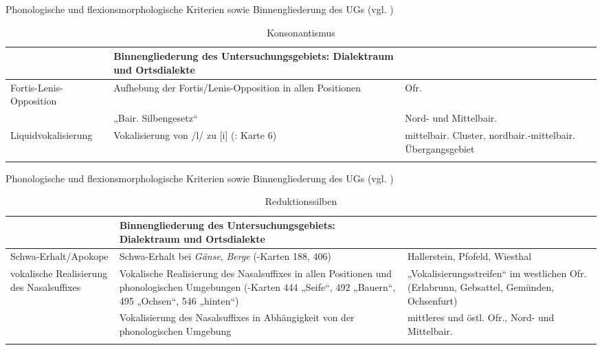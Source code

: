 \begin{table}
\ContinuedFloat
\caption{Phonologische und flexionsmorphologische Kriterien sowie Binnengliederung des UGs (vgl. \citealt[4--5]{Rowley1997})}

\begin{subtable}{\textwidth}
\caption{Konsonantismus}
\label{tab:12c}
\small
\begin{tabularx}{\textwidth}{>{\raggedright\arraybackslash}p{}QQ}
\lsptoprule

 & Binnengliederung des Untersuchungs\-gebiets: Dialektraum und Ortsdialekte\\
\midrule
Fortis-Lenis-Opposition & Aufhebung der Fortis/Lenis-Opposition in allen Positionen & Ofr.\\
\tablevspace
& „Bair. Silbengesetz“ & Nord- und Mittelbair.\\
\tablevspace
Liquidvokalisierung & Vokalisierung von /l/ zu [i] (\citealt{Gütter1971}: Karte 6) & mittelbair. Cluster, nordbair.-mittelbair. Übergangsgebiet\\
\lspbottomrule
\end{tabularx}
\end{subtable}
\end{table}

\begin{table}
\ContinuedFloat
\caption{Phonologische und flexionsmorphologische Kriterien sowie Binnengliederung des UGs (vgl. \citealt[4--5]{Rowley1997})}

\begin{subtable}{\textwidth}
\caption{Reduktionssilben}
\label{tab:12d}
\small
\begin{tabularx}{\textwidth}{>{\raggedright\arraybackslash}p{}QQ}
\lsptoprule

 & Binnengliederung des Untersuchungs\-gebiets: Dialektraum und Ortsdialekte\\
\midrule
Schwa-Erhalt\slash Apokope & Schwa-Erhalt bei \textit{Gänse}, \textit{Berge} (\citealt{WA}-Karten 188, 406) & Hallerstein, Pfofeld, Wiesthal\\
\tablevspace
vokalische Realisierung des Nasalsuffixes & Vokalische Realisierung des Nasalsuffixes in allen Positionen und phonologischen Umgebungen (\citealt{WA}-Karten 444 „Seife“, 492 „Bauern“, 495 „Ochsen“, 546 „hinten“) & „Vokalisierungsstreifen“ im westlichen Ofr. (Erlabrunn, Gebsattel, Gemünden, Ochsenfurt)\\
\tablevspace
& Vokalisierung des Nasalsuffixes in Abhängigkeit von der phonologischen Umgebung & mittleres und östl. Ofr., Nord- und Mittelbair. \\
\lspbottomrule
\end{tabularx}
\end{subtable}
\end{table}

